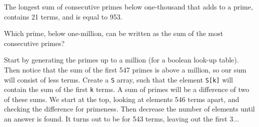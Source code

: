 The longest sum of consecutive primes below one-thousand that adds to a prime, contains 21 terms, and is equal to 953.

Which prime, below one-million, can be written as the sum of the most consecutive primes?

Start by generating the primes up to a million (for a boolean look-up table).  Then notice that the sum of the 
first 547 primes is above a million, so our sum will consist of less terms.  Create a \verb"S" array, such 
that the element \verb"S[k]" will contain the sum of the first \verb"k" terms.  A sum of primes will be a difference
of two of these sums.  We start at the top, looking at elements 546 terms apart, and checking the difference for
primeness.  Then decrease the number of elements until an answer is found.  It turns out to be
for 543 terms, leaving out the first 3...




